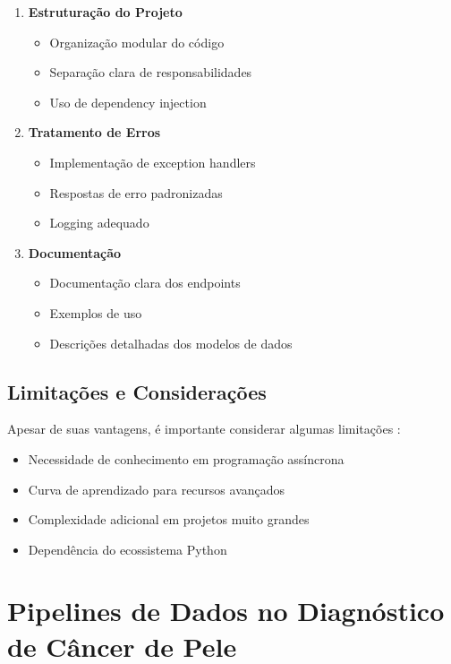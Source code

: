 \begin{enumerate}
\item \textbf{Estruturação do Projeto}
\begin{itemize}
\item Organização modular do código
\item Separação clara de responsabilidades
\item Uso de dependency injection
\end{itemize}

\item \textbf{Tratamento de Erros}
\begin{itemize}
    \item Implementação de exception handlers
    \item Respostas de erro padronizadas
    \item Logging adequado
\end{itemize}

\item \textbf{Documentação}
\begin{itemize}
    \item Documentação clara dos endpoints
    \item Exemplos de uso
    \item Descrições detalhadas dos modelos de dados
\end{itemize}

\end{enumerate}

\subsection{Limitações e Considerações}

Apesar de suas vantagens, é importante considerar algumas limitações \cite{kumar2023modern}:

\begin{itemize}
\item Necessidade de conhecimento em programação assíncrona
\item Curva de aprendizado para recursos avançados
\item Complexidade adicional em projetos muito grandes
\item Dependência do ecossistema Python
\end{itemize}


\section{Pipelines de Dados no Diagnóstico de Câncer de Pele}


